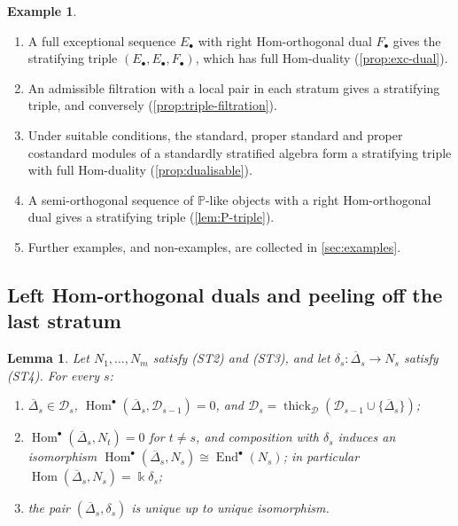 \documentclass[11pt,reqno]{amsart}
\theoremstyle{plain}
\newtheorem{lemma}[theorem]{Lemma}
\theoremstyle{definition}
\newtheorem{example}[theorem]{Example}
\theoremstyle{remark}
\newcommand{\kk}{\Bbbk}
\DeclareMathOperator{\Hom}{Hom}
\DeclareMathOperator{\End}{End}
\newcommand{\thick}[2][\cD]{\operatorname{thick}_{#1}(#2)}
\newcommand{\Deltabar}{\overline{\Delta}}
\newcommand{\cD}{\mathcal{D}}
\begin{document}
\begin{example}\label{ex:triples}
\leavevmode
\begin{enumerate}
\item A full exceptional sequence $E_\bullet$ with right Hom-orthogonal dual $F_\bullet$ gives the stratifying triple $(E_\bullet,E_\bullet,F_\bullet)$, which has full Hom-duality (\cref{prop:exc-dual}).
\item An admissible filtration with a local pair in each stratum gives a stratifying triple, and conversely (\cref{prop:triple-filtration}).
\item Under suitable conditions, the standard, proper standard and proper costandard modules of a standardly stratified algebra form a stratifying triple with full Hom-duality (\cref{prop:dualisable}).
\item A semi-orthogonal sequence of $\mathbb{P}$-like objects with a right Hom-orthogonal dual gives a stratifying triple (\cref{lem:P-triple}).
\item Further examples, and non-examples, are collected in \cref{sec:examples}.
\end{enumerate}
\end{example}

\subsection{Left Hom-orthogonal duals and peeling off the last stratum}

\begin{lemma}\label{lem:right-dual}
Let $N_1,\dots,N_m$ satisfy (ST2) and (ST3), and let $\delta_s\colon\Deltabar_s\to N_s$ satisfy (ST4). For every $s$:
\begin{enumerate}
\item $\Deltabar_s\in\cD_s$, $\Hom^\bullet(\Deltabar_s,\cD_{s-1})=0$, and $\cD_s=\thick{\cD_{s-1}\cup\{\Deltabar_s\}}$;
\item $\Hom^\bullet(\Deltabar_s,N_t)=0$ for $t\ne s$, and composition with $\delta_s$ induces an isomorphism $\Hom^\bullet(\Deltabar_s,N_s)\cong\End^\bullet(N_s)$; in particular $\Hom(\Deltabar_s,N_s)=\kk\delta_s$;
\item the pair $(\Deltabar_s,\delta_s)$ is unique up to unique isomorphism.
\end{enumerate}
\end{lemma}
\end{document}
